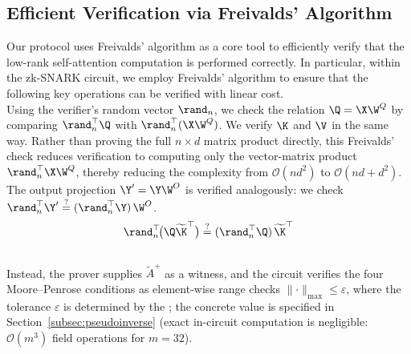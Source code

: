 \documentclass[runningheads]{llncs}
\begin{document}
\subsection{Efficient Verification via Freivalds' Algorithm}
\label{moore-penrose}
Our protocol uses Freivalds' algorithm as a core tool to efficiently verify that the low-rank self-attention computation is performed correctly. In particular, within the zk-SNARK circuit, we employ Freivalds' algorithm to ensure that the following key operations can be verified with linear cost. \\

Using the verifier's random vector $\rand_n$, we check the relation $\Q = \X \W^Q$ by comparing $\rand_n^{\top} \Q$ with $\rand_n^{\top}(\X \W^Q)$.
We verify $\K$ and $\V$ in the same way. Rather than proving the full $n\times d$ matrix product directly, this Freivalds' check reduces verification to computing only the vector-matrix product $\rand_n^{\top}\X \W^Q$, thereby reducing the complexity from $\mathcal{O}(n d^2)$ to $\mathcal{O}(nd + d^2)$. The output projection $\Y'=\Y \W^O$ is verified analogously: we check $\rand_n^{\top}\Y' \stackrel{?}{=} (\rand_n^{\top}\Y)\,\W^O$. \\

\[
\rand_n^{\top}\!\bigl(\Q\widetilde{\K}^{\top}\bigr)
\stackrel{?}{=}
(\rand_n^{\top}\Q)\,\widetilde{\K}^{\top}
\]
 \\

 Instead, the prover supplies $\tilde{A}^{+}$ as a witness, and the circuit verifies the four Moore--Penrose conditions  as element-wise range checks $\lVert\cdot\rVert_{\max}\leq\varepsilon$, where the tolerance $\varepsilon$ is determined by the ; the concrete value is specified in Section~\ref{subsec:pseudoinverse} (exact in-circuit computation is negligible: $\mathcal{O}(m^3)$ field operations for $m{=}32$). 
\end{document}
